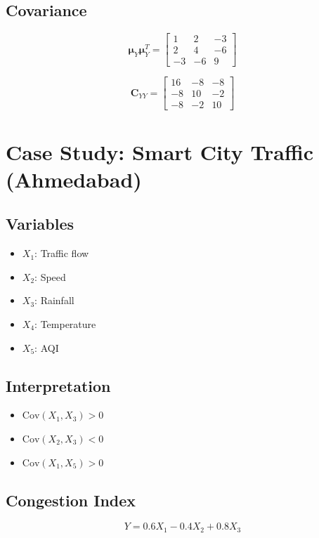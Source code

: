 \documentclass[11pt]{article}
\begin{document}
\subsection{Covariance}
\begin{equation}
\boldsymbol{\mu}_Y \boldsymbol{\mu}_Y^T =
\begin{bmatrix}
1 & 2 & -3 \\
2 & 4 & -6 \\
-3 & -6 & 9
\end{bmatrix}
\end{equation}

\begin{equation}
\mathbf{C}_{YY} =
\begin{bmatrix}
16 & -8 & -8 \\
-8 & 10 & -2 \\
-8 & -2 & 10
\end{bmatrix}
\end{equation}

\section{Case Study: Smart City Traffic (Ahmedabad)}

\subsection{Variables}
\begin{itemize}
    \item $X_1$: Traffic flow
    \item $X_2$: Speed
    \item $X_3$: Rainfall
    \item $X_4$: Temperature
    \item $X_5$: AQI
\end{itemize}

\subsection{Interpretation}
\begin{itemize}
    \item $\mathrm{Cov}(X_1,X_3) > 0$
    \item $\mathrm{Cov}(X_2,X_3) < 0$
    \item $\mathrm{Cov}(X_1,X_5) > 0$
\end{itemize}

\subsection{Congestion Index}
\begin{equation}
Y = 0.6X_1 - 0.4X_2 + 0.8X_3
\end{equation}
\end{document}
